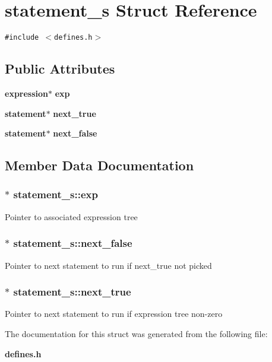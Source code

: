 \section{statement\_\-s  Struct Reference}
\label{structstatement__s}
{\tt \#include $<$defines.h$>$}

\subsection*{Public Attributes}
\begin{CompactItemize}
\item 
{\bf expression}$\ast$ {\bf exp}
\item 
{\bf statement}$\ast$ {\bf next\_\-true}
\item 
{\bf statement}$\ast$ {\bf next\_\-false}
\end{CompactItemize}


\subsection{Member Data Documentation}
\subsubsection{ $\ast$ statement\_\-s::exp}\label{structstatement__s_m0}


Pointer to associated expression tree 
\subsubsection{ $\ast$ statement\_\-s::next\_\-false}\label{structstatement__s_m2}


Pointer to next statement to run if next\_\-true not picked 
\subsubsection{ $\ast$ statement\_\-s::next\_\-true}\label{structstatement__s_m1}


Pointer to next statement to run if expression tree non-zero 

The documentation for this struct was generated from the following file:\begin{CompactItemize}
\item 
{\bf defines.h}\end{CompactItemize}
